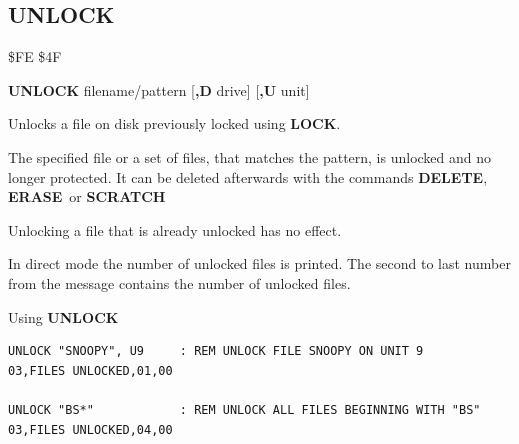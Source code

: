 \subsection{UNLOCK}
\begin{description}[leftmargin=2cm,style=nextline]
\item [Token:]    \$FE \$4F

\item [Format:]   {\bf UNLOCK} filename/pattern [{\bf,D} drive] [{\bf,U} unit]

\item [Usage:]    Unlocks a file on disk previously locked using {\bf LOCK}.

                  The specified file or a set of files, that matches the pattern, is unlocked and no longer protected. It can be deleted afterwards with the commands {\bf DELETE}, {\bf ERASE} or {\bf SCRATCH}

                  \filenamedefinition

                  \drivedefinition

                  \unitdefinition

\item [Remarks:]  Unlocking a file that is already unlocked has no effect.

                  In direct mode the number of unlocked files is printed. The second to last number from the message contains the number of unlocked files.

\item [Examples:] Using {\bf UNLOCK}

\begin{tcolorbox}[colback=black,coltext=white]
\verbatimfont{\codefont}
\begin{verbatim}
UNLOCK "SNOOPY", U9     : REM UNLOCK FILE SNOOPY ON UNIT 9
03,FILES UNLOCKED,01,00

UNLOCK "BS*"            : REM UNLOCK ALL FILES BEGINNING WITH "BS"
03,FILES UNLOCKED,04,00
\end{verbatim}
\end{tcolorbox}
\end{description}


\newpage
